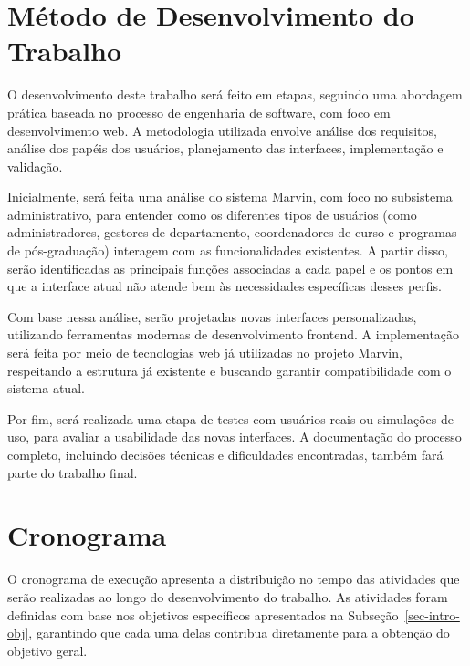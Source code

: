 \section{Método de Desenvolvimento do Trabalho}
\label{sec-intro-met}


O desenvolvimento deste trabalho será feito em etapas, seguindo uma abordagem prática baseada no processo de engenharia de software, com foco em desenvolvimento web. A metodologia utilizada envolve análise dos requisitos, análise dos papéis dos usuários, planejamento das interfaces, implementação e validação.

Inicialmente, será feita uma análise do sistema Marvin, com foco no subsistema administrativo, para entender como os diferentes tipos de usuários (como administradores, gestores de departamento, coordenadores de curso e programas de pós-graduação) interagem com as funcionalidades existentes. A partir disso, serão identificadas as principais funções associadas a cada papel e os pontos em que a interface atual não atende bem às necessidades específicas desses perfis.

Com base nessa análise, serão projetadas novas interfaces personalizadas, utilizando ferramentas modernas de desenvolvimento frontend. A implementação será feita por meio de tecnologias web já utilizadas no projeto Marvin, respeitando a estrutura já existente e buscando garantir compatibilidade com o sistema atual.

Por fim, será realizada uma etapa de testes com usuários reais ou simulações de uso, para avaliar a usabilidade das novas interfaces. A documentação do processo completo, incluindo decisões técnicas e dificuldades encontradas, também fará parte do trabalho final.

\section{Cronograma}
\label{sec-intro-crono}

O cronograma de execução apresenta a distribuição no tempo das atividades que serão realizadas ao longo do desenvolvimento do trabalho. As atividades foram definidas com base nos objetivos específicos apresentados na Subseção~\ref{sec-intro-obj}, garantindo que cada uma delas contribua diretamente para a obtenção do objetivo geral.

